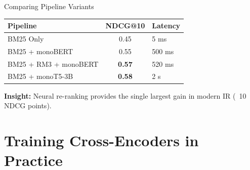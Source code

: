 \documentclass[aspectratio=169]{beamer}
\newif\ifanimated
\newcommand{\cpause}{\ifanimated\pause\fi}
\begin{document}
\begin{frame}{Comparing Pipeline Variants}
\begin{table}
\centering
\begin{tabular}{lcl}
\toprule
\textbf{Pipeline} & \textbf{NDCG@10} & \textbf{Latency} \\
\midrule
BM25 Only & 0.45 & 5 ms \\
BM25 + monoBERT & 0.55 & 500 ms \\
BM25 + RM3 + monoBERT & \textbf{0.57} & 520 ms \\
BM25 + monoT5-3B & \textbf{0.58} & 2 s \\
\bottomrule
\end{tabular}
\end{table}

\vspace{1em}
\cpause
\textbf{Insight:} Neural re-ranking provides the single largest gain in modern IR (~10 NDCG points).
\end{frame}




\section{Training Cross-Encoders in Practice}

\begin{frame}[plain]
\sectionpage
\end{frame}
\end{document}
